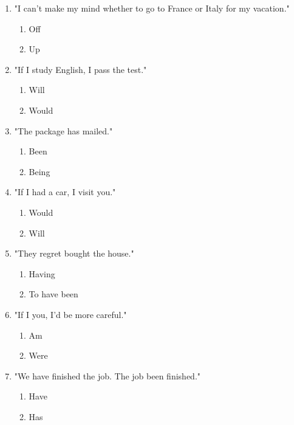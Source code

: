 \documentclass[11pt,a4paper]{article}
\begin{document}
\begin{enumerate}
    \item "I can't make \underline{\hspace{2cm}} my mind whether to go to France or Italy for my vacation."
    \begin{enumerate}[label=\alph*.] \item Off \item Up \end{enumerate}

    \item "If I study English, I \underline{\hspace{2cm}} pass the test."
    \begin{enumerate}[label=\alph*.] \item Will \item Would \end{enumerate}

    \item "The package has \underline{\hspace{2cm}} mailed."
    \begin{enumerate}[label=\alph*.] \item Been \item Being \end{enumerate}

    \item "If I had a car, I \underline{\hspace{2cm}} visit you."
    \begin{enumerate}[label=\alph*.] \item Would \item Will \end{enumerate}

    \item "They regret \underline{\hspace{2cm}} bought the house."
    \begin{enumerate}[label=\alph*.] \item Having \item To have been \end{enumerate}

    \item "If I \underline{\hspace{2cm}} you, I'd be more careful."
    \begin{enumerate}[label=\alph*.] \item Am \item Were \end{enumerate}

    \item "We have finished the job. The job \underline{\hspace{2cm}} been finished."
    \begin{enumerate}[label=\alph*.] \item Have \item Has \end{enumerate}


\end{enumerate}
\end{document}
